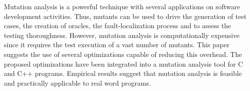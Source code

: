 Mutation analysis is a powerful technique with several applications on
software development activities. Thus, mutants can be used to drive the
generation of test cases, the creation of oracles, the fault-localization
process and to assess the testing thoroughness. However, mutation analysis is
computationally expensive since it requires the test execution of a vast
number of mutants. This paper suggests the use of several optimizations
capable of reducing this overhead. The proposed optimizations have been
integrated into a mutation analysis tool for C and C++ programs. Empirical
results suggest that mutation analysis is feasible and practically applicable
to real word programs.
